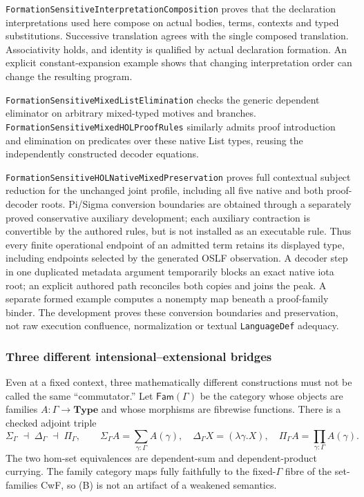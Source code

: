 \documentclass[11pt]{article}
\theoremstyle{definition}
\theoremstyle{remark}
\begin{document}
\nolinkurl{FormationSensitiveInterpretationComposition} proves that the
declaration interpretations used here compose on actual bodies, terms,
contexts and typed substitutions. Successive translation agrees with the
single composed translation. Associativity holds, and identity is qualified
by actual declaration formation. An explicit constant-expansion example
shows that changing interpretation order can change the resulting program.

\nolinkurl{FormationSensitiveMixedListElimination} checks the generic
dependent eliminator on arbitrary mixed-typed motives and branches.
\nolinkurl{FormationSensitiveMixedHOLProofRules} similarly admits proof
introduction and elimination on predicates over these native List types,
reusing the independently constructed decoder equations.

\nolinkurl{FormationSensitiveHOLNativeMixedPreservation} proves full
contextual subject reduction for the unchanged joint profile, including
all five native and both proof-decoder roots. Pi/Sigma conversion boundaries
are obtained through a separately proved conservative auxiliary development;
each auxiliary contraction is convertible by the authored rules, but is
not installed as an executable rule. Thus every finite operational endpoint
of an admitted term retains its displayed type, including endpoints selected
by the generated OSLF observation. A decoder step in one duplicated metadata
argument temporarily blocks an exact native iota root; an explicit authored
path reconciles both copies and joins the peak. A separate formed example
computes a nonempty map beneath a proof-family binder. The development proves
these conversion boundaries and preservation, not raw execution confluence,
normalization or textual \nolinkurl{LanguageDef} adequacy.

\subsubsection{Three different intensional--extensional bridges}

Even at a fixed context, three mathematically different constructions must not
be called the same ``commutator.''  Let $\mathsf{Fam}(\Gamma)$ be the category
whose objects are families $A:\Gamma\to\mathbf{Type}$ and whose morphisms are
fibrewise functions.  There is a checked adjoint triple
\[
  \Sigma_\Gamma\;\dashv\;\Delta_\Gamma\;\dashv\;\Pi_\Gamma,
  \qquad
  \Sigma_\Gamma A=\sum_{\gamma:\Gamma}A(\gamma),\quad
  \Delta_\Gamma X=(\lambda\gamma.X),\quad
  \Pi_\Gamma A=\prod_{\gamma:\Gamma}A(\gamma).           \tag{B}
\]
The two hom-set equivalences are dependent-sum and dependent-product currying.
The family category maps fully faithfully to the fixed-$\Gamma$ fibre of the
set-families CwF, so (B) is not an artifact of a weakened semantics.
\end{document}
